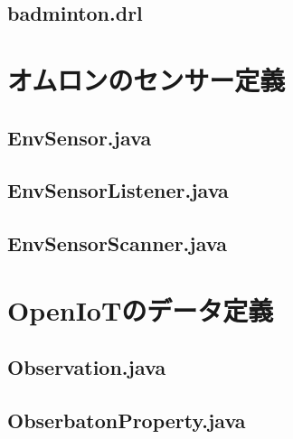 \documentclass{kuisthesis}			%
\begin{document}
\subsection{badminton.drl}


\section{オムロンのセンサー定義}
\subsection{EnvSensor.java}


\subsection{EnvSensorListener.java}


\subsection{EnvSensorScanner.java}


\section{OpenIoTのデータ定義}
\subsection{Observation.java}


\subsection{ObserbatonProperty.java}

\end{document}
